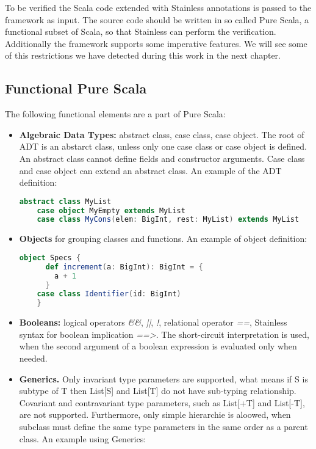 To be verified the Scala code extended with Stainless annotations is passed to the framework as input.
The source code should be written in so called Pure Scala, a functional subset of Scala, so that Stainless can perform the verification.
Additionally the framework supports some imperative features. We will see some of this restrictions we have detected during this work in the next chapter.

\subsection{Functional Pure Scala}
The following functional elements are a part of Pure Scala:
\begin{itemize}
  \item \textbf{Algebraic Data Types:} abstract class, case class, case object. 
  The root of ADT is an abstarct class, unless only one case class or case object is defined.
  An abstract class cannot define fields and constructor arguments. 
  Case class and case object can extend an abstract class.
  An example of the ADT definition:
  \begin{lstlisting}[language=Scala]
    abstract class MyList
    case object MyEmpty extends MyList
    case class MyCons(elem: BigInt, rest: MyList) extends MyList
  \end{lstlisting}
  \item \textbf{Objects} for grouping classes and functions.
  An example of object definition:
  \begin{lstlisting}[language=Scala]
    object Specs {
      def increment(a: BigInt): BigInt = {
        a + 1
      }
    case class Identifier(id: BigInt)
    }
  \end{lstlisting}
  \item \textbf{Booleans:} logical operators  \textit{\&\&}, \textit{||}, \textit{!}, relational operator \textit{==}, Stainless syntax for boolean implication \textit{==>}. 
  The short-circuit interpretation is used, when the second argument of a boolean expression is evaluated only when needed.  
  \item \textbf{Generics.} Only invariant type parameters are supported, what means if S is subtype of T then List[S] and List[T] do not have sub-typing relationship.
  Covariant and contravariant type parameters, such as List[+T] and List[-T], are not supported. 
  Furthermore, only simple hierarchie is aloowed, when subclass must define the same type parameters in the same order as a parent class.
  An example using Generics:

\end{itemize}
